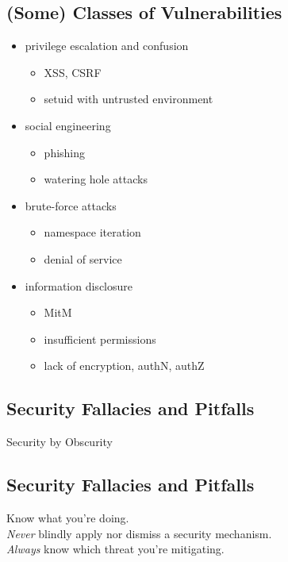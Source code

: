 \documentclass[xga]{xdvislides}
\begin{document}
\subsection{(Some) Classes of Vulnerabilities}
\begin{itemize}
	\item privilege escalation and confusion
		\begin{itemize}
			\item XSS, CSRF
			\item setuid with untrusted environment
		\end{itemize}
	\item social engineering
		\begin{itemize}
			\item phishing
			\item watering hole attacks
		\end{itemize}
	\item brute-force attacks
		\begin{itemize}
			\item namespace iteration
			\item denial of service
		\end{itemize}
	\item information disclosure
		\begin{itemize}
			\item MitM
			\item insufficient permissions
			\item lack of encryption, authN, authZ
		\end{itemize}
\end{itemize}

\subsection{Security Fallacies and Pitfalls}
\vspace*{\fill}
\begin{center}
	\Hugesize
        Security by Obscurity \\
\end{center}
\vspace*{\fill}

\subsection{Security Fallacies and Pitfalls}
\vspace*{\fill}
\begin{center}
	\Hugesize
	Know what you're doing. \\
\addvspace{.25in}
	\Normalsize
	{\em Never} blindly apply nor dismiss a security mechanism. \\
\addvspace{.125in}
	{\em Always} know which threat you're mitigating.
\end{center}
\vspace*{\fill}
\end{document}
